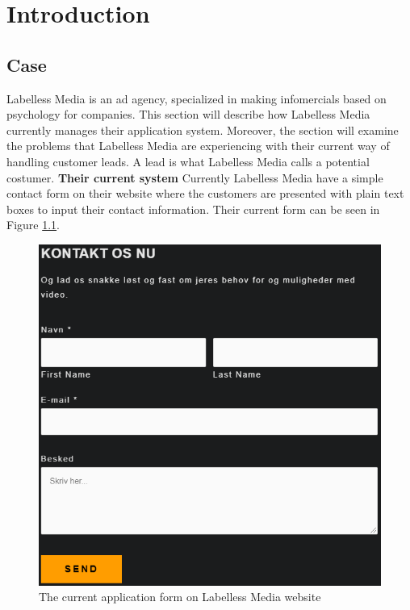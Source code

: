 
\chapter{Introduction}



\section{Case}\label{ch:case}
Labelless Media is an ad agency, specialized in making infomercials based on psychology for companies.
This section will describe how Labelless Media currently manages their application system. Moreover, the section will examine the problems that Labelless Media are experiencing with their current way of handling customer leads. A lead is what Labelless Media calls a potential costumer.
\newline \newline \noindent
\textbf{Their current system}\newline
Currently Labelless Media have a simple contact form on their website where the customers are presented with plain text boxes to input their contact information. Their current form can be seen in Figure \ref{fig:CurrentAppForm}.
\newline
\begin{figure}[H]
    \centering
    \includegraphics[scale=0.8, clip]{figures/currentApplicationForm.png}
    \caption{The current application form on Labelless Media website}
    \label{fig:CurrentAppForm}
\end{figure}
